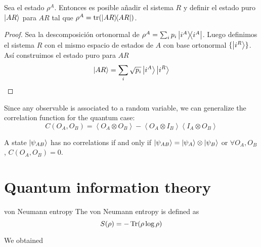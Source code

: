 \begin{proposition}
	Sea el estado $\rho^A$. Entonces es posible añadir el sistema $R$ y definir el estado puro $\ket{AR}$ para $AR$ tal que $\rho^A=\tr(\ketbra{AR})$.
\end{proposition}
\begin{proof}
	Sea la descomposición ortonormal de $\rho^A=\sum_ip_i\ketbra{i^A}$. Luego definimos el sistema $R$ con el mismo espacio de estados de $A$ con base ortonormal $\{\ket{i^R}\}$. Así construimos el estado puro para $AR$
	\[\ket{AR}=\sum_i\sqrt{p_i}\ket{i^A}\ket{i^R}\]
\end{proof}
Since any observable is associated to a random variable, we can generalize the correlation function for the quantum case:
\begin{equation}
	C(O_A, O_B) = \left\langle O_A \otimes O_B\right\rangle - \left\langle O_A\otimes I_B\right\rangle \left\langle I_A \otimes O_B\right\rangle
\end{equation}
\begin{proposition}
	A state $\ket{\psi_{AB}}$ has no correlations if and only if $\ket{\psi_{AB}} = \ket{\psi_A}\otimes \ket{\psi_B}$ or $\forall O_A,O_B$, $C(O_A,O_B) = 0$.
\end{proposition}

\section{Quantum information theory}
\begin{Definition}{von Neumann entropy}{}
	The von Neumann entropy is defined as
	\begin{equation*}
		S(\rho) = -\Tr(\rho\log \rho)
	\end{equation*}
\end{Definition}
\begin{Summary}{}
	We obtained
\end{Summary}
